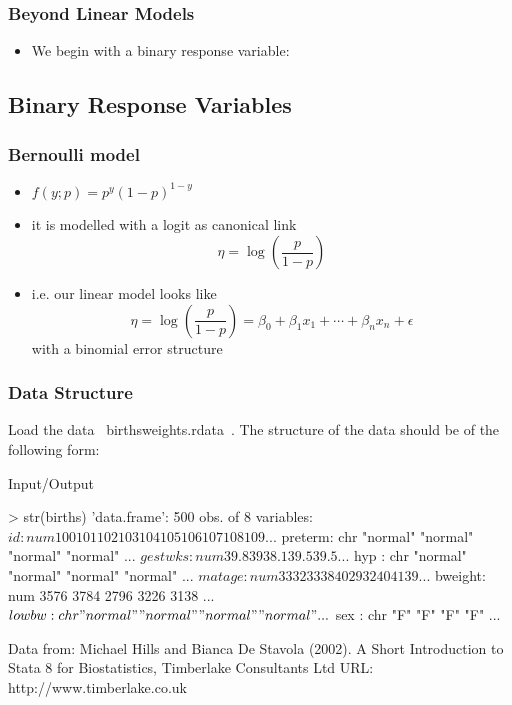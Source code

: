 \begin{frame}\frametitle{Beyond Linear Models}
  \begin{itemize}
    \item We begin with a binary response variable:
  \end{itemize}
\end{frame}

\subsection{Binary Response Variables}

\begin{frame}\frametitle{Bernoulli model}
  \begin{itemize}
  \item $f(y;p) = p^y(1-p)^{1-y}$
  \item it is modelled with a logit as canonical link $$ \eta = \log(\frac{p}{1-p})$$
  \item i.e. our linear model looks like $$ \eta = \log(\frac{p}{1-p}) = \beta_0 + \beta_1 x_1 + \cdots + \beta_n x_n + \epsilon$$ with a binomial error structure
  \end{itemize}
\end{frame}



\begin{frame}[fragile]\frametitle{Data Structure}
Load the data ~birthsweights.rdata~. 
The structure of the data should be of the following form:
\footnotesize
\begin{exampleblock}{Input/Output}
\begin{semiverbatim}
    > str(births)
    'data.frame':	500 obs. of  8 variables:
    $ id     : num  100 101 102 103 104 105 106 107 108 109 ...
    $ preterm: chr  "normal" "normal" "normal" "normal" ...
    $ gestwks: num  39.8 39 38.1 39.5 39.5 ...
    $ hyp    : chr  "normal" "normal" "normal" "normal" ...
    $ matage : num  33 32 33 38 40 29 32 40 41 39 ...
    $ bweight: num  3576 3784 2796 3226 3138 ...
    $ lowbw  : chr  "normal" "normal" "normal" "normal" ...
    $ sex    : chr  "F" "F" "F" "F" ...
\end{semiverbatim}
\end{exampleblock}
Data from: Michael Hills and Bianca De Stavola (2002). A Short Introduction
     to Stata 8 for Biostatistics, Timberlake Consultants Ltd URL:
     http://www.timberlake.co.uk
\end{frame}


